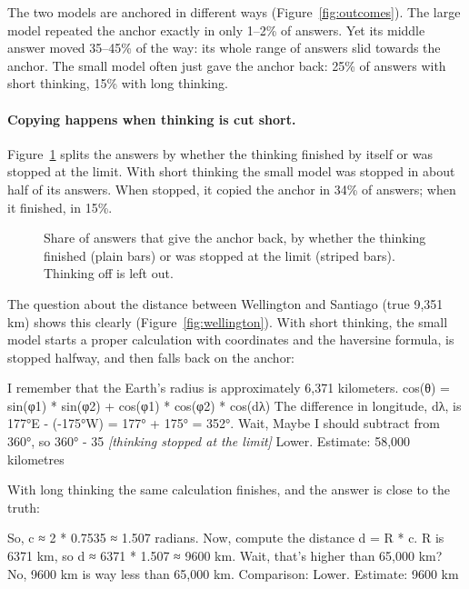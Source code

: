 \documentclass[11pt,a4paper]{article}
\begin{document}
The two models are anchored in different ways (Figure~\ref{fig:outcomes}). The large model repeated the anchor exactly in only 1--2\% of answers. Yet its middle answer moved 35--45\% of the way: its whole range of answers slid towards the anchor. The small model often just gave the anchor back: 25\% of answers with short thinking, 15\% with long thinking.

\paragraph{Copying happens when thinking is cut short.} Figure~\ref{fig:cutoff} splits the answers by whether the thinking finished by itself or was stopped at the limit. With short thinking the small model was stopped in about half of its answers. When stopped, it copied the anchor in 34\% of answers; when it finished, in 15\%.

\begin{figure}[ht]
\centering{}
\caption{Share of answers that give the anchor back, by whether the thinking finished (plain bars) or was stopped at the limit (striped bars). Thinking off is left out.}
\label{fig:cutoff}
\end{figure}

The question about the distance between Wellington and Santiago (true 9,351\,km) shows this clearly (Figure~\ref{fig:wellington}). With short thinking, the small model starts a proper calculation with coordinates and the haversine formula, is stopped halfway, and then falls back on the anchor:

\begin{transcript}
\cut{} I remember that the Earth's radius is approximately 6,371 kilometers. \cut{} cos(θ) = sin(φ1) * sin(φ2) + cos(φ1) * cos(φ2) * cos(dλ) \cut{} The difference in longitude, dλ, is 177°E - (-175°W) = 177° + 175° = 352°. Wait, \cut{} Maybe I should subtract from 360°, so 360° - 35 \textit{[thinking stopped at the limit]}
 Lower. Estimate: 58,000 kilometres
\end{transcript}

With long thinking the same calculation finishes, and the answer is close to the truth:

\begin{transcript}
\cut{} So, c ≈ 2 * 0.7535 ≈ 1.507 radians. Now, compute the distance d = R * c. R is 6371 km, so d ≈ 6371 * 1.507 ≈ 9600 km. Wait, that's higher than 65,000 km? No, 9600 km is way less than 65,000 km.
 Comparison: Lower. Estimate: 9600 km
\end{transcript}
\end{document}
